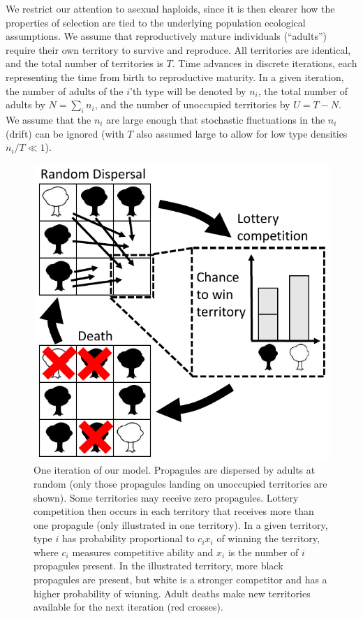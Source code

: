 \documentclass[12pt]{article}
\begin{document}
We restrict our attention to asexual haploids, since it is then clearer how the properties of selection are tied to the underlying population ecological assumptions. We assume that reproductively mature individuals (``adults'') require their own territory to survive and reproduce. All territories are identical, and the total number of territories is $T$. Time advances in discrete iterations, each representing the time from birth to reproductive maturity. In a given iteration, the number of adults of the $i$'th type will be denoted by $n_i$, the total number of adults by $N=\sum_i n_i$, and the number of unoccupied territories by $U=T-N$. We assume that the $n_i$ are large enough that stochastic fluctuations in the $n_i$ (drift) can be ignored (with $T$ also assumed large to allow for low type densities $n_i/T\ll 1$). 

\begin{figure}
\centering
\includegraphics[scale=0.8]{lottery.pdf}
\caption{\label{fig:lottery} One iteration of our model. Propagules are dispersed by adults at random (only those propagules landing on unoccupied territories are shown). Some territories may receive zero propagules. Lottery competition then occurs in each territory that receives more than one propagule (only illustrated in one territory). In a given territory, type $i$ has probability proportional to $c_i x_i$ of winning the territory, where $c_i$ measures competitive ability and $x_i$ is the number of $i$ propagules present. In the illustrated territory, more black propagules are present, but white is a stronger competitor and has a higher probability of winning. Adult deaths make new territories available for the next iteration (red crosses).}
\end{figure}
\end{document}
